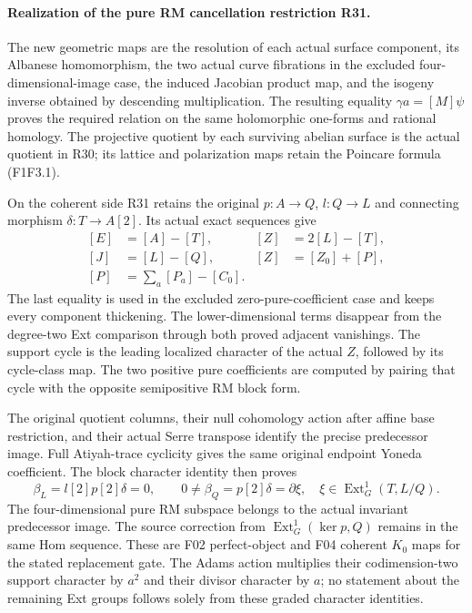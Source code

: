 \paragraph{Realization of the pure RM cancellation restriction R31.}
The new geometric maps are the resolution of each
actual surface component, its Albanese homomorphism,
the two actual curve fibrations in the excluded
four-dimensional-image case, the induced Jacobian
product map, and the isogeny inverse obtained by
descending multiplication. The resulting equality
$\gamma a=[M]\psi$ proves the required relation
on the same holomorphic one-forms and rational
homology. The projective quotient by each surviving
abelian surface is the actual quotient in R30;
its lattice and polarization maps retain the
Poincare formula (F1F3.1).

On the coherent side R31 retains the original
$p:A\to Q$, $l:Q\to L$ and connecting morphism
$\delta:T\to A[2]$. Its actual exact sequences give
\[
 \begin{aligned}
 [E]&=[A]-[T],& [Z]&=2[L]-[T],\\
 [J]&=[L]-[Q],& [Z]&=[Z_0]+[P],\\
 [P]&=\sum_a[P_a]-[C_0].
 \end{aligned}
\]
The last equality is used in the excluded
zero-pure-coefficient case and keeps every
component thickening. The lower-dimensional
terms disappear from the degree-two Ext comparison
through both proved adjacent vanishings.
The support cycle is the leading localized
character of the actual $Z$, followed by its
cycle-class map. The two positive pure coefficients
are computed by pairing that cycle with the
opposite semipositive RM block form.

The original quotient columns, their null
cohomology action after affine base restriction,
and their actual Serre transpose identify the
precise predecessor image. Full Atiyah-trace
cyclicity gives the same original endpoint
Yoneda coefficient. The block character identity
then proves
\[
 \beta_L=l[2]p[2]\delta=0,
 \qquad
 0\ne\beta_Q=p[2]\delta=\partial\xi,
 \quad \xi\in\operatorname{Ext}^1_G(T,L/Q).
\]
The four-dimensional pure RM subspace belongs
to the actual invariant predecessor image.
The source correction from
$\operatorname{Ext}^1_G(\ker p,Q)$ remains in
the same Hom sequence. These are F02 perfect-object
and F04 coherent $K_0$ maps for the stated
replacement gate. The Adams action multiplies
their codimension-two support character by $a^2$
and their divisor character by $a$; no statement
about the remaining Ext groups follows solely
from these graded character identities.

